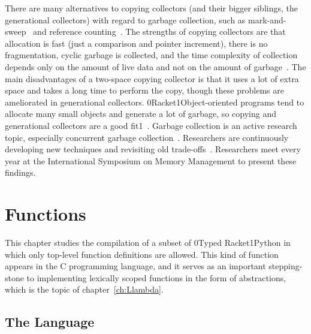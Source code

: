 \documentclass[7x10]{TimesAPriori_MIT}%
\def\racketEd{0}
\def\pythonEd{1}
\def\edition{1}
\newcommand{\racket}[1]{{\if\edition\racketEd{#1}\fi}}
\newcommand{\pythonColor}[0]{}
\newcommand{\python}[1]{{\if\edition\pythonEd\pythonColor #1\fi}}
\numberwithin{theorem}{chapter}
\numberwithin{definition}{chapter}
\numberwithin{equation}{chapter}
\begin{document}
There are many alternatives to copying collectors (and their bigger
siblings, the generational collectors) with regard to garbage
collection, such as mark-and-sweep~\citep{McCarthy:1960dz} and
reference counting~\citep{Collins:1960aa}.  The strengths of copying
collectors are that allocation is fast (just a comparison and pointer
increment), there is no fragmentation, cyclic garbage is collected,
and the time complexity of collection depends only on the amount of
live data and not on the amount of garbage~\citep{Wilson:1992fk}. The
main disadvantages of a two-space copying collector is that it uses a
lot of extra space and takes a long time to perform the copy, though
these problems are ameliorated in generational collectors.
\racket{Racket}\python{Object-oriented} programs tend to allocate many
small objects and generate a lot of garbage, so copying and
generational collectors are a good fit\python{~\citep{Dieckmann99}}.
Garbage collection is an active research topic, especially concurrent
garbage collection~\citep{Tene:2011kx}. Researchers are continuously
developing new techniques and revisiting old
trade-offs~\citep{Blackburn:2004aa,Jones:2011aa,Shahriyar:2013aa,Cutler:2015aa,Shidal:2015aa,Osterlund:2016aa,Jacek:2019aa,Gamari:2020aa}. Researchers
meet every year at the International Symposium on Memory Management to
present these findings.


\chapter{Functions}
\label{ch:Lfun}
\setcounter{footnote}{0}

This chapter studies the compilation of a subset of \racket{Typed
  Racket}\python{Python} in which only top-level function definitions
are allowed. This kind of function appears in the C programming
language, and it serves as an important stepping-stone to implementing
lexically scoped functions in the form of 
abstractions, which is the topic of chapter~\ref{ch:Llambda}.

\section{The \LangFun{} Language}
\end{document}
